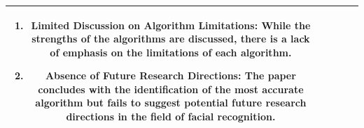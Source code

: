 \documentclass[aspectratio=169]{beamer}
\begin{document}
\begin{frame}
\begin{table}[]
\begin{tabular}{|c|c|c|c|c|}
\begin{minipage}[t]{0.3\textwidth}
\begin{enumerate}
					\item Limited Discussion on Algorithm Limitations: While the strengths of the algorithms are discussed, there is a lack of emphasis on the limitations of each algorithm.

					\item Absence of Future Research Directions: The paper concludes with the identification of the most accurate algorithm but fails to suggest potential future research directions in the field of facial recognition.
				\end{enumerate}
			\end{minipage}                                                                                                                                                                                                                                                                             \\ \hline
		\end{tabular}
	\end{table}
\end{frame}
\end{document}
